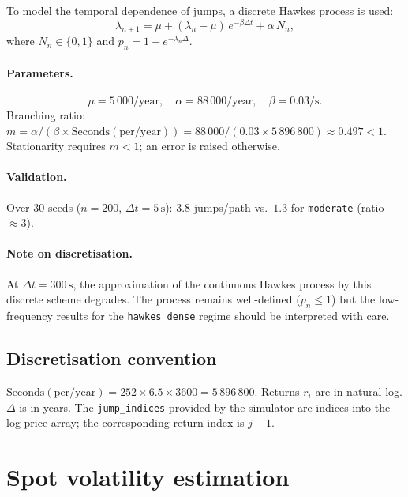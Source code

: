 \documentclass[11pt,a4paper,twocolumn]{article}
\theoremstyle{plain}
\theoremstyle{definition}
\theoremstyle{remark}
\newcommand{\dt}{\Delta}
\begin{document}
To model the temporal dependence of jumps, a discrete Hawkes process is used:
\begin{equation}\label{eq:hawkes}
  \lambda_{n+1} = \mu + (\lambda_n - \mu)\,e^{-\beta\dt t} + \alpha\,N_n,
\end{equation}
where $N_n \in \{0,1\}$ and $p_n = 1 - e^{-\lambda_n \dt}$.

\paragraph{Parameters.}
\begin{equation}
  \mu = 5\,000/\mathrm{year},\quad
  \alpha = 88\,000/\mathrm{year},\quad
  \beta = 0.03/\mathrm{s}.
\end{equation}
Branching ratio:
$m = \alpha / (\beta \times \mathrm{Seconds(per/year)}) = 88\,000 / (0.03 \times 5\,896\,800) \approx 0.497 < 1$.
Stationarity requires $m < 1$; an error is raised otherwise.

\paragraph{Validation.}
Over 30 seeds ($n = 200$, $\dt t = 5\,\mathrm{s}$): $3.8$ jumps/path vs.\
$1.3$ for \texttt{moderate} (ratio $\approx 3$).

\paragraph{Note on discretisation.}
At $\dt t = 300\,\mathrm{s}$, the approximation of the continuous Hawkes
process by this discrete scheme degrades. The process remains well-defined
($p_n \le 1$) but the low-frequency results for the \texttt{hawkes\_dense}
regime should be interpreted with care.

\subsection{Discretisation convention}

$\mathrm{Seconds(per/year)} = 252 \times 6.5 \times 3600 = 5\,896\,800$.
Returns $r_i$ are in natural log. $\dt$ is in years. The
\texttt{jump\_indices} provided by the simulator are indices into the
log-price array; the corresponding return index is $j - 1$.

\section{Spot volatility estimation}
\label{sec:estimators}
\end{document}
